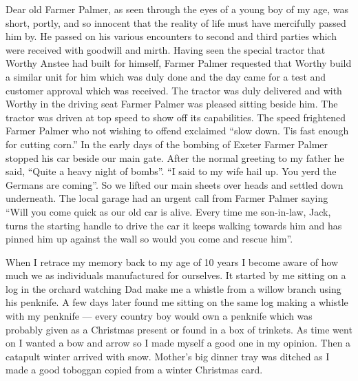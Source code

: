 
Dear old Farmer Palmer, as seen through the eyes of a young boy of my age, was
short, portly, and so innocent that the reality of life must have mercifully
passed him by. He passed on his various encounters to second and third parties
which were received with goodwill and mirth. Having seen the special tractor
that Worthy Anstee had built for himself, Farmer Palmer requested that Worthy
build a similar unit for him which was duly done and the day came for a test
and customer approval which was received. The tractor was duly delivered and
with Worthy in the driving seat Farmer Palmer was pleased sitting beside him.
The tractor was driven at top speed to show off its capabilities. The speed
frightened Farmer Palmer who not wishing to offend exclaimed ``slow down. Tis
fast enough for cutting corn.'' In the early days of the bombing of Exeter
Farmer Palmer stopped his car beside our main gate. After the normal greeting
to my father he said, ``Quite a heavy night of bombs''. ``I said to my wife
hail up. You yerd the Germans are coming''. So we lifted our main sheets over
heads and settled down underneath. The local garage had an urgent call from
Farmer Palmer saying ``Will you come quick as our old car is alive. Every time
me son-in-law, Jack, turns the starting handle to drive the car it keeps
walking towards him and has pinned him up against the wall so would you come
and rescue him''.

When I retrace my memory back to my age of 10 years I become aware of how much
we as individuals manufactured for ourselves. It started by me sitting on a log
in the orchard watching Dad make me a whistle from a willow branch using his
penknife. A few days later found me sitting on the same log making a whistle
with my penknife --- every country boy would own a penknife which was probably
given as a Christmas present or found in a box of trinkets. As time went on I
wanted a bow and arrow so I made myself a good one in my opinion. Then a
catapult winter arrived with snow. Mother's big dinner tray was ditched as I
made a good toboggan copied from a winter Christmas card.


